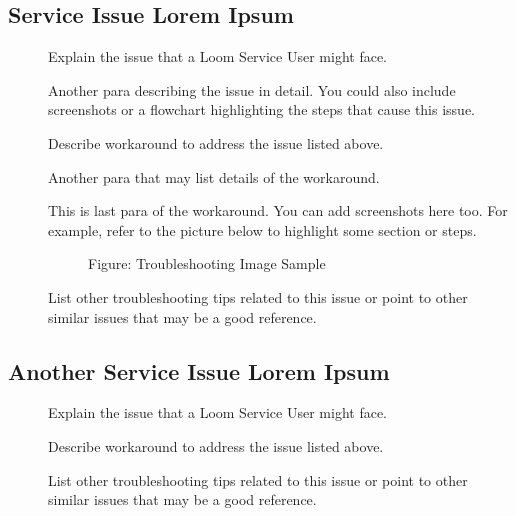 \documentclass[letterpaper,10pt,english]{sphinxmanual}
\begin{document}
\subsection{Service Issue Lorem Ipsum}
\label{\detokenize{mcdmp_docx_res:service-issue-lorem-ipsum}}\begin{description}
\item[{}] \leavevmode
Explain the issue that a Loom Service User might face.

Another para describing the issue in detail. You could also include screenshots or a flowchart highlighting the steps that cause this issue.

\item[{}] \leavevmode
Describe workaround to address the issue listed above.

Another para that may list details of the workaround.

This is last para of the workaround. You can add screenshots here too. For example, refer to the picture below to highlight some section or steps.

\begin{figure}[htbp]
\centering
\capstart

\noindent{}
\caption{Figure: Troubleshooting Image Sample}\label{\detokenize{mcdmp_docx_res:id10}}\end{figure}

\item[{}] \leavevmode
List other troubleshooting tips related to this issue or point to other similar issues that may be a good reference.

\end{description}


\subsection{Another Service Issue Lorem Ipsum}
\label{\detokenize{mcdmp_docx_res:another-service-issue-lorem-ipsum}}\begin{description}
\item[{}] \leavevmode
Explain the issue that a Loom Service User might face.

\item[{}] \leavevmode
Describe workaround to address the issue listed above.

\item[{}] \leavevmode
List other troubleshooting tips related to this issue or point to other similar issues that may be a good reference.

\end{description}



\renewcommand{\indexname}{Index}
\printindex
\end{document}
